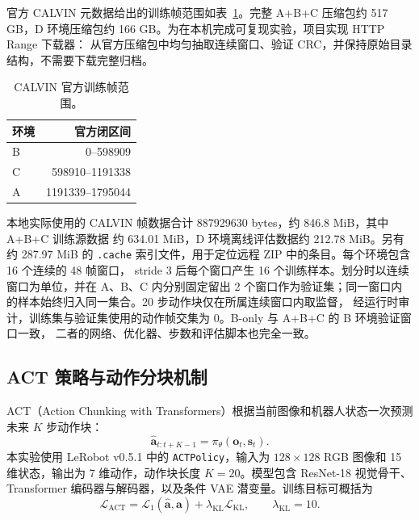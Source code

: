 \documentclass[10pt,a4paper,UTF8,fontset=windows]{ctexart}
\newcommand{\code}[1]{\texttt{\small #1}}
\begin{document}
官方 CALVIN 元数据给出的训练帧范围如表~\ref{tab:calvin-ranges}。完整 A+B+C 压缩包约
517 GB，D 环境压缩包约 166 GB。为在本机完成可复现实验，项目实现 HTTP Range 下载器：
从官方压缩包中均匀抽取连续窗口、验证 CRC，并保持原始目录结构，不需要下载完整归档。

\begin{table}[H]
\centering
\caption{CALVIN 官方训练帧范围。}
\label{tab:calvin-ranges}
\begin{tabular}{lr}
\toprule
环境 & 官方闭区间 \\
\midrule
B & 0--598909 \\
C & 598910--1191338 \\
A & 1191339--1795044 \\
\bottomrule
\end{tabular}
\end{table}

\begin{table}[H]
\centering
\caption{题目二资源约束下的正式子集协议。}
\label{tab:task2-subset}
\end{table}

本地实际使用的 CALVIN 帧数据合计 887929630 bytes，约 846.8 MiB，其中 A+B+C 训练源数据
约 634.01 MiB，D 环境离线评估数据约 212.78 MiB。另有约 287.97 MiB 的
\code{.cache} 索引文件，用于定位远程 ZIP 中的条目。每个环境包含 16 个连续的 48 帧窗口，
stride 3 后每个窗口产生 16 个训练样本。划分时以连续窗口为单位，并在 A、B、C 内分别固定留出
2 个窗口作为验证集；同一窗口内的样本始终归入同一集合。20 步动作块仅在所属连续窗口内取监督，
经运行时审计，训练集与验证集使用的动作帧交集为 0。B-only 与 A+B+C 的 B 环境验证窗口一致，
二者的网络、优化器、步数和评估脚本也完全一致。

\subsection{ACT 策略与动作分块机制}

ACT（Action Chunking with Transformers）根据当前图像和机器人状态一次预测未来 $K$ 步动作块：
\begin{equation}
  \hat{\mathbf{a}}_{t:t+K-1}
  = \pi_{\theta}(\mathbf{o}_{t}, \mathbf{s}_{t}).
\end{equation}
本实验使用 LeRobot v0.5.1 中的 \code{ACTPolicy}，输入为 $128\times128$ RGB 图像和
15 维状态，输出为 7 维动作，动作块长度 $K=20$。模型包含 ResNet-18 视觉骨干、Transformer
编码器与解码器，以及条件 VAE 潜变量。训练目标可概括为
\begin{equation}
  \mathcal{L}_{\text{ACT}}
  = \mathcal{L}_{1}(\hat{\mathbf{a}},\mathbf{a})
  + \lambda_{\text{KL}}\mathcal{L}_{\text{KL}},
  \qquad \lambda_{\text{KL}}=10.
\end{equation}
\end{document}
